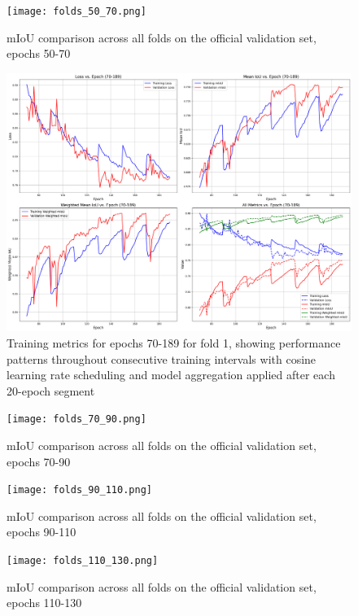 \documentclass[]{article}
\begin{document}
\begin{figure}[htbp]
    \centering
    \texttt{[image: folds\_50\_70.png]}
    \caption{mIoU comparison across all folds on the official validation set, epochs 50-70}
    \label{fig:cross_val_50_70_val}
\end{figure}

\begin{figure}[htbp]
    \centering
    \includegraphics[width=1.0\textwidth]{../outputs/deeplabv3plus_test_results/late_training_epochs_70_to_189.png}
		\caption{Training metrics for epochs 70-189 for fold 1, showing performance patterns throughout consecutive training intervals with cosine learning rate scheduling and model aggregation applied after each 20-epoch segment}
    \label{fig:train_metrics_70_189}
\end{figure}

\begin{figure}[htbp]
		\centering
		\texttt{[image: folds\_70\_90.png]}
		\caption{mIoU comparison across all folds on the official validation set, epochs 70-90}
		\label{fig:cross_val_70_90_val}
\end{figure}

\begin{figure}[htbp]
		\centering
		\texttt{[image: folds\_90\_110.png]}
		\caption{mIoU comparison across all folds on the official validation set, epochs 90-110}
		\label{fig:cross_val_90_110_val}
\end{figure}

\begin{figure}[htbp]
		\centering
		\texttt{[image: folds\_110\_130.png]}
		\caption{mIoU comparison across all folds on the official validation set, epochs 110-130}
		\label{fig:cross_val_110_130_val}
\end{figure}
\end{document}
